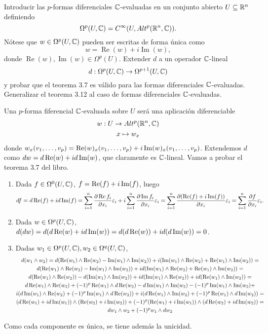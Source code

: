 \documentclass[twoside]{article}
\begin{document}
\begin{ejercicio}{3.5}
Introducir las $p$-formas diferenciales $\mathbb{C}$-evaluadas en un conjunto abierto $U\subseteq\mathbb{R}^n$ definiendo
\[
\Omega^p(U,\mathbb{C})=C^{\infty}(U,Alt^p(\mathbb{R}^n,\mathbb{C})).
\]
Nótese que $w\in\Omega^p(U,\mathbb{C})$ pueden ser escritas de forma única como
\[
w=\operatorname{Re}(w)+i\operatorname{Im}(w),
\]
donde $\operatorname{Re}(w),\operatorname{Im}(w)\in \Omega^p(U)$. Extender $d$ a un operador $\mathbb{C}$-lineal 
\[
d:\Omega^p(U,\mathbb{C})\to\Omega^{p+1}(U,\mathbb{C})
\]
y probar que el teorema 3.7 es válido para las formas diferenciales $\mathbb{C}$-evaluadas. Generalizar el teorema 3.12 al caso de formas diferenciales $\mathbb{C}$-evaluadas.
\end{ejercicio}
\begin{solucion}
Una $p$-forma fiferencial $\mathbb{C}$-evaluada sobre $U$ será una aplicación diferenciable 
\begin{gather*}
w: U\to Alt^p(\mathbb{R}^n,\mathbb{C})\\
x\mapsto w_x
\end{gather*}
donde $w_x(v_1,\dots, v_p)=\operatorname{Re}(w)_x(v_1,\dots,v_p)+i\operatorname{Im}(w)_x(v_1,\dots, v_p)$. Extendemos $d$ como $dw=d\operatorname{Re}(w)+id\operatorname{Im}(w)$, que claramente es $\mathbb{C}$-lineal. Vamos a probar el teorema 3.7 del libro. 

\begin{enumerate}
\item Dada $f\in\Omega^0(U,\mathbb{C})$, $f=\operatorname{Re}(f)+i\operatorname{Im}(f)$, luego 
\[
df=d\operatorname{Re}(f)+id\operatorname{Im}(f)=\sum_{i=1}^n\frac{\partial \operatorname{Re}{f}_i}{\partial x_i}\varepsilon_i+i\sum_{i=1}^n\frac{\partial \operatorname{Im}{f}_i}{\partial x_i}\varepsilon_i=\sum_{i=1}^n\frac{\partial (\operatorname{Re}(f)+i\operatorname{Im}(f))}{\partial x_i}\varepsilon_i=\sum_{i=1}^n\frac{\partial f}{\partial x_i}\varepsilon_i.
\]
\item Dada $w\in\Omega^p(U,\mathbb{C})$, $d(dw)=d(d\operatorname{Re}(w)+id\operatorname{Im}(w))=d(d\operatorname{Re}(w))+id(d\operatorname{Im}(w))=0$.
\item Dadas $w_1\in\Omega^p(U,\mathbb{C}),w_2\in\Omega^q(U,\mathbb{C})$, 
\begin{gather*}
d(w_1\land w_2)=d(\operatorname{Re}(w_1)\land\operatorname{Re}(w_2)-\operatorname{Im}(w_1)\land\operatorname{Im}(w_2))+i(\operatorname{Im}(w_1)\land\operatorname{Re}(w_2)+\operatorname{Re}(w_1)\land\operatorname{Im}(w_2))=\\
d(\operatorname{Re}(w_1)\land\operatorname{Re}(w_2)-\operatorname{Im}(w_1)\land\operatorname{Im}(w_2))+id(\operatorname{Im}(w_1)\land\operatorname{Re}(w_2)+\operatorname{Re}(w_1)\land\operatorname{Im}(w_2))=\\
d(\operatorname{Re}(w_1)\land\operatorname{Re}(w_2))-d(\operatorname{Im}(w_1)\land\operatorname{Im}(w_2))+id(\operatorname{Im}(w_1)\land\operatorname{Re}(w_2))+id(\operatorname{Re}(w_1)\land\operatorname{Im}(w_2))=\\
d\operatorname{Re}(w_1)\land\operatorname{Re}(w_2)+(-1)^p\operatorname{Re}(w_1)\land d\operatorname{Re}(w_2)-d\operatorname{Im}(w_1)\land\operatorname{Im}(w_2)-(-1)^p\operatorname{Im}(w_1)\land\operatorname{Im}(w_2)+\\
i(d\operatorname{Im}(w_1)\land\operatorname{Re}(w_2)+(-1)^p\operatorname{Im}(w_1)\land d\operatorname{Re}(w_2))+i(d\operatorname{Re}(w_1)\land\operatorname{Im}(w_2)+(-1)^p\operatorname{Re}(w_1)\land d\operatorname{Im}(w_2))=\\
(d\operatorname{Re}(w_1)+id\operatorname{Im}(w_1))\land(\operatorname{Re}(w_2)+i\operatorname{Im}(w_2))+(-1)^p(\operatorname{Re}(w_1)+i\operatorname{Im}(w_1))\land (d\operatorname{Re}(w_2)+id\operatorname{Im}(w_2))=\\
dw_1\land w_2+(-1)^pw_1\land dw_2
\end{gather*}
\end{enumerate}
Como cada componente es única, se tiene además la unicidad.


\end{solucion}
\end{document}
